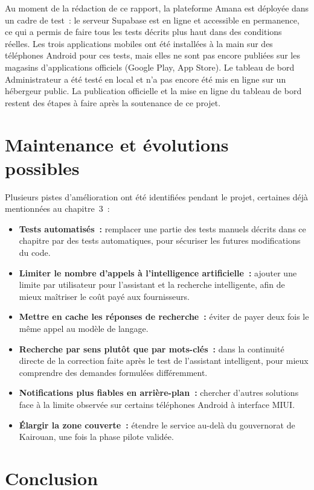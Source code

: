 \documentclass[12pt,fleqn,a4paper]{report}
\begin{document}
\begin{justify}
Au moment de la rédaction de ce rapport, la plateforme Amana est déployée dans un cadre de test~: le serveur Supabase est en ligne et accessible en permanence, ce qui a permis de faire tous les tests décrits plus haut dans des conditions réelles. Les trois applications mobiles ont été installées à la main sur des téléphones Android pour ces tests, mais elles ne sont pas encore publiées sur les magasins d'applications officiels (Google Play, App Store). Le tableau de bord Administrateur a été testé en local et n'a pas encore été mis en ligne sur un hébergeur public. La publication officielle et la mise en ligne du tableau de bord restent des étapes à faire après la soutenance de ce projet.

\section{Maintenance et évolutions possibles}

Plusieurs pistes d'amélioration ont été identifiées pendant le projet, certaines déjà mentionnées au chapitre~3~:

\begin{itemize}
    \item \textbf{Tests automatisés~:} remplacer une partie des tests manuels décrits dans ce chapitre par des tests automatiques, pour sécuriser les futures modifications du code.
    \item \textbf{Limiter le nombre d'appels à l'intelligence artificielle~:} ajouter une limite par utilisateur pour l'assistant et la recherche intelligente, afin de mieux maîtriser le coût payé aux fournisseurs.
    \item \textbf{Mettre en cache les réponses de recherche~:} éviter de payer deux fois le même appel au modèle de langage.
    \item \textbf{Recherche par sens plutôt que par mots-clés~:} dans la continuité directe de la correction faite après le test de l'assistant intelligent, pour mieux comprendre des demandes formulées différemment.
    \item \textbf{Notifications plus fiables en arrière-plan~:} chercher d'autres solutions face à la limite observée sur certains téléphones Android à interface MIUI.
    \item \textbf{Élargir la zone couverte~:} étendre le service au-delà du gouvernorat de Kairouan, une fois la phase pilote validée.
\end{itemize}

\section{Conclusion}


\end{justify}
\end{document}
